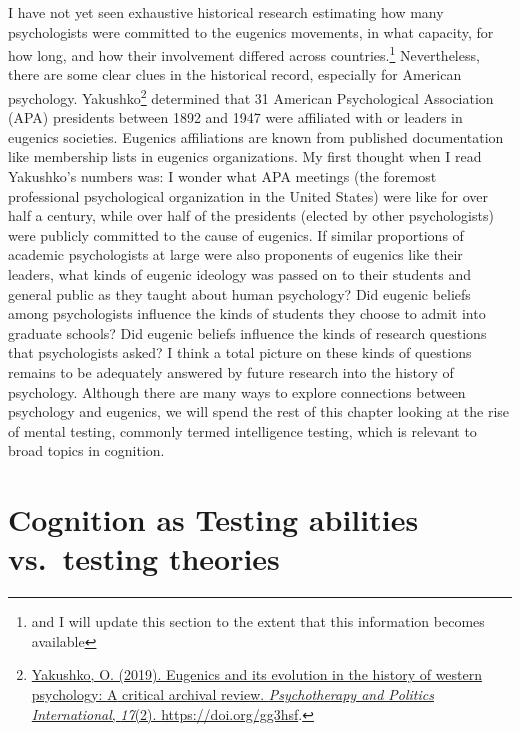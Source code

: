 \documentclass[
  oneside,
  12pt]{crumpbook}
\begin{document}
I have not yet seen exhaustive historical research estimating how many psychologists were committed to the eugenics movements, in what capacity, for how long, and how their involvement differed across countries.\footnote{and I will update this section to the extent that this information becomes available} Nevertheless, there are some clear clues in the historical record, especially for American psychology. Yakushko\footnote{\protect\hyperlink{ref-yakushkoEugenicsItsEvolution2019}{Yakushko, O. (2019). Eugenics and its evolution in the history of western psychology: {A} critical archival review. \emph{Psychotherapy and Politics International}, \emph{17}(2). \url{https://doi.org/gg3hsf}}.} determined that 31 American Psychological Association (APA) presidents between 1892 and 1947 were affiliated with or leaders in eugenics societies. Eugenics affiliations are known from published documentation like membership lists in eugenics organizations. My first thought when I read Yakushko's numbers was: I wonder what APA meetings (the foremost professional psychological organization in the United States) were like for over half a century, while over half of the presidents (elected by other psychologists) were publicly committed to the cause of eugenics. If similar proportions of academic psychologists at large were also proponents of eugenics like their leaders, what kinds of eugenic ideology was passed on to their students and general public as they taught about human psychology? Did eugenic beliefs among psychologists influence the kinds of students they choose to admit into graduate schools? Did eugenic beliefs influence the kinds of research questions that psychologists asked? I think a total picture on these kinds of questions remains to be adequately answered by future research into the history of psychology. Although there are many ways to explore connections between psychology and eugenics, we will spend the rest of this chapter looking at the rise of mental testing, commonly termed intelligence testing, which is relevant to broad topics in cognition.

\hypertarget{cognition-as-testing-abilities-vs.-testing-theories}{%
\section{Cognition as Testing abilities vs.~testing theories}\label{cognition-as-testing-abilities-vs.-testing-theories}}
\end{document}
